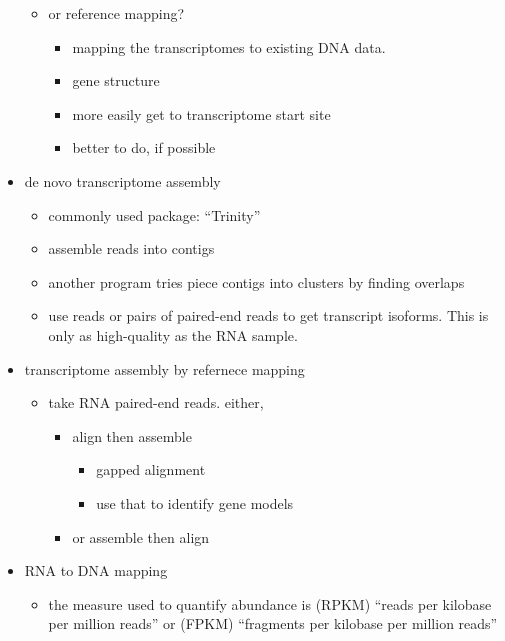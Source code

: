\documentclass{article}
\begin{document}
\begin{itemize}
\begin{itemize}
\begin{itemize}
            \end{itemize}
            \item or reference mapping?
            \begin{itemize}
                \item mapping the transcriptomes to existing DNA data.
                \item gene structure
                \item more easily get to transcriptome start site
                \item better to do, if possible
            \end{itemize}
        \end{itemize}
        \item de novo transcriptome assembly
        \begin{itemize}
            \item commonly used package: ``Trinity''
            \item assemble reads into contigs
            \item another program tries piece contigs into clusters by finding overlaps
            \item use reads or pairs of paired-end reads to get transcript isoforms.  This is only as high-quality as the RNA sample.
        \end{itemize}
        \item transcriptome assembly by refernece mapping
        \begin{itemize}
            \item take RNA paired-end reads.  either,
            \begin{itemize}
                \item align then assemble
                \begin{itemize}
                    \item gapped alignment
                    \item use that to identify gene models
                \end{itemize}
                \item or assemble then align
            \end{itemize}
        \end{itemize}
        \item RNA to DNA mapping
        \begin{itemize}
            \item the measure used to quantify abundance is (RPKM) ``reads per kilobase per million reads'' or (FPKM) ``fragments per kilobase per million reads''

\end{itemize}
\end{itemize}
\end{document}
